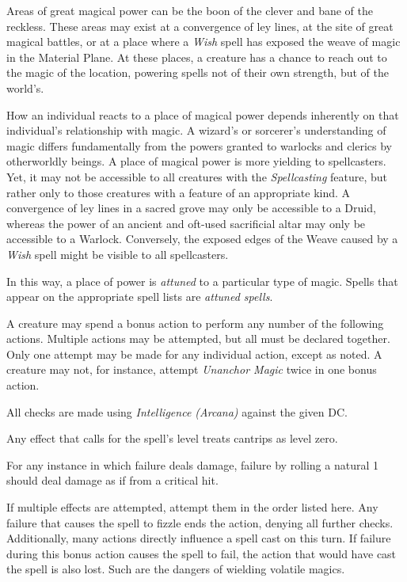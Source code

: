 \documentclass{article}
\begin{document}
\begin{multicols}{2}

  Areas of great magical power can be the boon of the clever and bane of the reckless.
  These areas may exist at a convergence of ley lines, at the site of great magical battles, or at a place where a {\it Wish} spell has exposed the weave of magic in the Material Plane.
  At these places, a creature has a chance to reach out to the magic of the location, powering spells not of their own strength, but of the world's.
  
  How an individual reacts to a place of magical power depends inherently on that individual's relationship with magic.
  A wizard's or sorcerer's understanding of magic differs fundamentally from the powers granted to warlocks and clerics by otherworldly beings.
  A place of magical power is more yielding to spellcasters.
  Yet, it may not be accessible to all creatures with the {\it Spellcasting} feature, but rather only to those creatures with a feature of an appropriate kind.
  A convergence of ley lines in a sacred grove may only be accessible to a Druid, whereas the power of an ancient and oft-used sacrificial altar may only be accessible to a Warlock.
  Conversely, the exposed edges of the Weave caused by a {\it Wish} spell might be visible to all spellcasters.

  In this way, a place of power is {\it attuned} to a particular type of magic.
  Spells that appear on the appropriate spell lists are {\it attuned spells}.

  A creature may spend a bonus action to perform any number of the following actions.
  Multiple actions may be attempted, but all must be declared together.
  Only one attempt may be made for any individual action, except as noted.
  A creature may not, for instance, attempt {\it Unanchor Magic} twice in one bonus action.

  All checks are made using {\it Intelligence (Arcana)} against the given DC.
  
  Any effect that calls for the spell's level treats cantrips as level zero.
  
  For any instance in which failure deals damage, failure by rolling a natural 1 should deal damage as if from a critical hit.

  
  
  If multiple effects are attempted, attempt them in the order listed here.
  Any failure that causes the spell to fizzle ends the action, denying all further checks.
  Additionally, many actions directly influence a spell cast on this turn.
  If failure during this bonus action causes the spell to fail, the action that would have cast the spell is also lost.
  Such are the dangers of wielding volatile magics.
  



\end{multicols}
\end{document}
